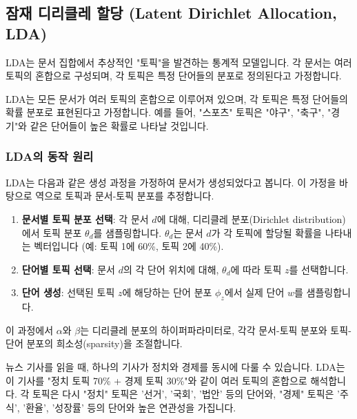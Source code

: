 \documentclass[11pt,a4paper]{article}
\theoremstyle{definition}
\begin{document}
\newpage
\subsection{잠재 디리클레 할당 (Latent Dirichlet Allocation, LDA)}
LDA는 문서 집합에서 추상적인 "토픽"을 발견하는 통계적 모델입니다. 각 문서는 여러 토픽의 혼합으로 구성되며, 각 토픽은 특정 단어들의 분포로 정의된다고 가정합니다.

\begin{tcolorbox}[definition={LDA의 핵심 가정}]
LDA는 모든 문서가 여러 토픽의 혼합으로 이루어져 있으며, 각 토픽은 특정 단어들의 확률 분포로 표현된다고 가정합니다. 예를 들어, "스포츠" 토픽은 "야구", "축구", "경기"와 같은 단어들이 높은 확률로 나타날 것입니다.
\end{tcolorbox}

\subsubsection{LDA의 동작 원리}
LDA는 다음과 같은 생성 과정을 가정하여 문서가 생성되었다고 봅니다. 이 가정을 바탕으로 역으로 토픽과 문서-토픽 분포를 추정합니다.

\begin{enumerate}
    \item \textbf{문서별 토픽 분포 선택}: 각 문서 $d$에 대해, 디리클레 분포(Dirichlet distribution)에서 토픽 분포 $\theta_d$를 샘플링합니다. $\theta_d$는 문서 $d$가 각 토픽에 할당될 확률을 나타내는 벡터입니다 (예: 토픽 1에 60\%, 토픽 2에 40\%).
    \item \textbf{단어별 토픽 선택}: 문서 $d$의 각 단어 위치에 대해, $\theta_d$에 따라 토픽 $z$를 선택합니다.
    \item \textbf{단어 생성}: 선택된 토픽 $z$에 해당하는 단어 분포 $\phi_z$에서 실제 단어 $w$를 샘플링합니다.
\end{enumerate}
이 과정에서 $\alpha$와 $\beta$는 디리클레 분포의 하이퍼파라미터로, 각각 문서-토픽 분포와 토픽-단어 분포의 희소성(sparsity)을 조절합니다.

\begin{tcolorbox}[example={LDA의 토픽 할당 예시}]
뉴스 기사를 읽을 때, 하나의 기사가 정치와 경제를 동시에 다룰 수 있습니다. LDA는 이 기사를 "정치 토픽 70\% + 경제 토픽 30\%"와 같이 여러 토픽의 혼합으로 해석합니다. 각 토픽은 다시 "정치" 토픽은 '선거', '국회', '법안' 등의 단어와, "경제" 토픽은 '주식', '환율', '성장률' 등의 단어와 높은 연관성을 가집니다.
\end{tcolorbox}
\end{document}
